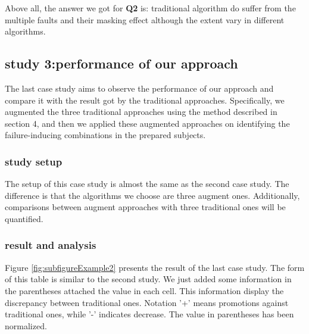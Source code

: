 \documentclass{sig-alternate}
\begin{document}
Above all, the answer we got for \textbf{Q2} is: traditional algorithm do suffer from the multiple faults and their masking effect although the extent vary in different algorithms.

\subsection{study 3:performance of our approach}
The last case study aims to observe the performance of our approach and compare it with the result got by the traditional approaches. Specifically, we augmented the three traditional approaches using the method described in section 4, and then we applied these augmented approaches on identifying the failure-inducing combinations in the prepared subjects.

\subsubsection{study setup}
The setup of this case study is almost the same as the second case study. The difference is that the algorithms we choose are three augment ones. Additionally, comparisons between augment approaches with three traditional ones will be quantified.

\subsubsection{result and analysis}
Figure \ref{fig:subfigureExample2} presents the result of the last case study. The form of this table is similar to the second study. We just added some information in the parentheses attached the value in each cell. This information display the  discrepancy between traditional ones. Notation '+' means promotions against traditional ones, while '-' indicates decrease. The value in parentheses has been normalized.
\end{document}
